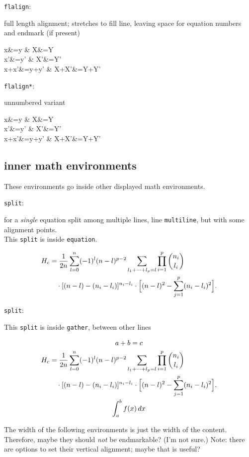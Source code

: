\documentclass[leqno]{article}
\newcommand{\testtype}[2]{\texttt{#1}:%
  #2}
\newcommand{\makeoutertest}[3]{
  \begin{test}
    \testtype{#1}{#2}
    #3
  \end{test}
}
\newcommand{\maketest}[3]{
  \makeoutertest{#1}{#2}{
    \begin{#1}
      #3
    \end{#1}
  }
}
\begin{document}
\maketest{flalign}{
  full length alignment; stretches to fill line, leaving space for equation numbers and endmark (if present)\\
}{
  x&=y & X&=Y\\
  x'&=y' & X'&=Y'\\
  x+x'&=y+y' & X+X'&=Y+Y'%
}
\maketest{flalign*}{
  unnumbered variant
}{
  x&=y & X&=Y\\
  x'&=y' & X'&=Y'\\
  x+x'&=y+y' & X+X'&=Y+Y'
}
\subsection{inner math environments}
These environments go inside other displayed math environments.

\makeoutertest{split}{
  for a \emph{single} equation split among multiple lines, line \texttt{multiline}, but with some alignment points.\\
  This \texttt{split} is inside \texttt{equation}.
}{
  \begin{equation}
    \begin{split}
      H_c
      &=\frac{1}{2n} \sum^n_{l=0}(-1)^{l}(n-{l})^{p-2}
        \sum_{l _1+\dots+ l _p=l}\prod^p_{i=1} \binom{n_i}{l _i}\\
      &\quad\cdot[(n-l )-(n_i-l _i)]^{n_i-l _i}\cdot
        \Bigl[(n-l )^2-\sum^p_{j=1}(n_i-l _i)^2\Bigr].
    \end{split}
  \end{equation}
}
\makeoutertest{split}{
  This \texttt{split} is inside \texttt{gather}, between other lines
}{
  \begin{gather}
    a + b = c\\
    \begin{split}
      H_c
      &=\frac{1}{2n} \sum^n_{l=0}(-1)^{l}(n-{l})^{p-2}
        \sum_{l _1+\dots+ l _p=l}\prod^p_{i=1} \binom{n_i}{l _i}\\
      &\quad\cdot[(n-l )-(n_i-l _i)]^{n_i-l _i}\cdot
        \Bigl[(n-l )^2-\sum^p_{j=1}(n_i-l _i)^2\Bigr].
    \end{split}\\
    \int_a^b f(x)\, dx
  \end{gather}
}

The width of the following environments is just the width of the content.
Therefore, maybe they should \emph{not} be endmarkable? (I'm not sure.)
Note: there are options to set their vertical alignment; maybe that is useful?
\end{document}
